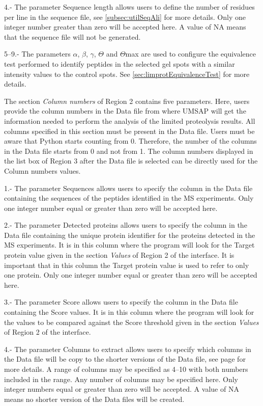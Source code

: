 \num{4}.- The parameter Sequence length\label{par:limprotSeqL} allows users to define the number of residues per line in the sequence file, see \autoref{subsec:utilSeqAli} for more details. Only one integer number greater than zero will be accepted here. A value of NA means that the sequence file will not be generated.

\numrange[range-phrase = --]{5}{9}.- The parameters $\alpha$, $\beta$, $\gamma$, $\Theta$ and $\Theta$max are used to configure the equivalence test\cite{Limentani2005} performed to identify peptides in the selected gel spots with a similar intensity values to the control spots. See \autoref{sec:limprotEquivalenceTest} for more details.

The section \textit{Column numbers} of Region \num{2} contains five parameters. Here, users provide the column numbers in the Data file from where UMSAP will get the information needed to perform the analysis of the limited proteolysis results. All columns specified in this section must be present in the Data file. Users must be aware that Python starts counting from \num{0}. Therefore, the number of the columns in the Data file starts from \num{0} and not from \num{1}. The column numbers displayed in the list box of Region \num{3} after the Data file is selected can be directly used for the Column numbers values.  

\num{1}.- The parameter Sequences allows users to specify the column in the Data file containing the sequences of the peptides identified in the MS experiments. Only one integer number equal or greater than zero will be accepted here.

\num{2}.- The parameter Detected proteins allows users to specify the column in the Data file containing the unique protein identifier for the proteins detected in the MS experiments. It is in this column where the program will look for the Target protein value given in the section \textit{Values} of Region \num{2} of the interface. It is important that in this column the Target protein value is used to refer to only one protein. Only one integer number equal or greater than zero will be accepted here.

\num{3}.- The parameter Score allows users to specify the column in the Data file containing the Score values. It is in this column where the program will look for the values to be compared against the Score threshold given in the section \textit{Values} of Region \num{2} of the interface.

\num{4}.- The parameter Columns to extract\label{par:limprotColumnExtract} allows users to specify which columns in the Data file will be copy to the shorter versions of the Data file, see page \pageref{subsec:utilShortDF} for more details. A range of columns may be specified as \numrange[range-phrase = --]{4}{10} with both numbers included in the range. Any number of columns may be specified here. Only integer numbers equal or greater than zero will be accepted. A value of NA means no shorter version of the Data files will be created.

